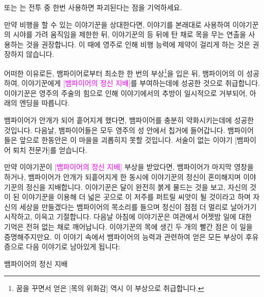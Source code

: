 \documentclass{report}
\begin{document}
	 또는 는 전투 중 한번 사용하면 파괴된다는 점을 기억하세요.
	
	만약 비행을 할 수 있는 이야기꾼을 상대한다면,  이야기를 본래대로 사용하여 이야기꾼의 시야를 가려 움직임을 제한한 뒤, 이야기꾼의 등 뒤에 탄 채로 목을 무는 연출을 사용하는 것을 권장합니다. 이 때에 영주로 인해 비행 능력에 제약이 걸리게 하는 것은 권장하지 않습니다.
	
	어떠한 이유로든, 뱀파이어로부터 최소한 한 번의 부상\footnote{꿈을 꾸면서 얻은 \textcolor{RubineRed}{[목의 위화감]} 역시 이 부상으로 취급합니다.}을 입은 뒤, 뱀파이어의 이 성공하여, 이야기꾼에게 \textcolor{Magenta}{[뱀파이어의 정신 지배]}를 부여하는데에 성공한 것으로 취급합니다. 이야기꾼은 영주의 주술의 힘으로 인해 이야기에서의 추방이 일시적으로 거부되어, 아래의 엔딩을 따릅니다.
	
	\medskip
	
	뱀파이어가 안개가 되어 흩어지게 했다면, 뱀파이어를 충분히 약화시키는데에 성공한 것입니다. 다음날, 뱀파이어들은 모두 영주의 성 안에서 칩거에 들어갑니다. 뱀파이어들은 앞으로 한동안은 이 마을을 괴롭히지 못할 것입니다. 서술이 없는 이야기 [뱀파이어 퇴치 전문가]를 얻습니다.
	
	만약 이야기꾼이 \textcolor{Magenta}{[뱀파이어의 정신 지배]} 부상을 받았다면, 뱀파이어가 마지막 영창을 하거나, 뱀파이어가 안개가 되흩어지게 한 동시에 이야기꾼의 정신이 혼미해지며 이야기꾼의 정신을 지배합니다. 이야기꾼은 달이 완전히 붉게 물드는 것을 보고, 자신의 것이 된 이야기꾼을 이용해 더 넓은 곳으로 이 저주를 퍼트릴 씨앗이 될 것이라고 하며 자신의 세상을 만들겠다는 뱀파이어의 목소리를 들으며 정신이 점점 더 멀리로 날아가기 시작하고, 이윽고 기절합니다. 다음날 아침에 이야기꾼은 여관에서 어젯밤 일에 대한 기억은 전혀 없는 채로 깨어납니다. 이야기꾼의 목에 생긴 두 개의 빨간 점은 이 일을 증명해주지만요. 이 이야기 속에서 뱀파이어의 능력과 관련하여 얻은 모든 부상이 후유증으로 다음 이야기로 남아있게 됩니다:
	
	\begin{lite}{뱀파이어의 정신 지배}
	\end{lite}
	
	
\end{document}
